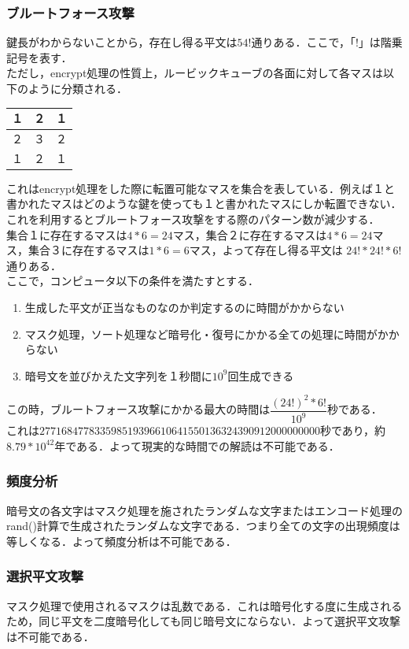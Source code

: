 \documentclass{jsarticle}
\begin{document}
\subsubsection{ブルートフォース攻撃}
鍵長がわからないことから，存在し得る平文は$54!$通りある．ここで，「$!$」は階乗記号を表す．\\
ただし，encrypt処理の性質上，ルービックキューブの各面に対して各マスは以下のように分類される．
\begin{table}[htb]
  \begin{tabular}{|l|c|r|} \hline
    １ & ２ & １ \\ \hline
    ２ & ３ & ２ \\ \hline
    １ & ２ & １ \\ \hline
  \end{tabular}
\end{table}
これはencrypt処理をした際に転置可能なマスを集合を表している．例えば１と書かれたマスはどのような鍵を使っても１と書かれたマスにしか転置できない．これを利用するとブルートフォース攻撃をする際のパターン数が減少する．\\
集合１に存在するマスは$4*6=24$マス，集合２に存在するマスは$4*6=24$マス，集合３に存在するマスは$1*6=6$マス，よって存在し得る平文は $24!*24!*6!$通りある．\\
ここで，コンピュータ以下の条件を満たすとする．
\begin{enumerate}
  \item 生成した平文が正当なものなのか判定するのに時間がかからない
  \item マスク処理，ソート処理など暗号化・復号にかかる全ての処理に時間がかからない
  \item 暗号文を並びかえた文字列を１秒間に$10^9$回生成できる
\end{enumerate}
この時，ブルートフォース攻撃にかかる最大の時間は$\dfrac{(24!)^2*6!}{10^9}$秒である．\\
これは$277168477833598519396610641550136324390912000000000$秒であり，約$8.79*10^{42}$年である．よって現実的な時間での解読は不可能である．

\subsubsection{頻度分析}
暗号文の各文字はマスク処理を施されたランダムな文字またはエンコード処理のrand()計算で生成されたランダムな文字である．つまり全ての文字の出現頻度は等しくなる．よって頻度分析は不可能である．
\subsubsection{選択平文攻撃}
マスク処理で使用されるマスクは乱数である．これは暗号化する度に生成されるため，同じ平文を二度暗号化しても同じ暗号文にならない．よって選択平文攻撃は不可能である．
\end{document}
